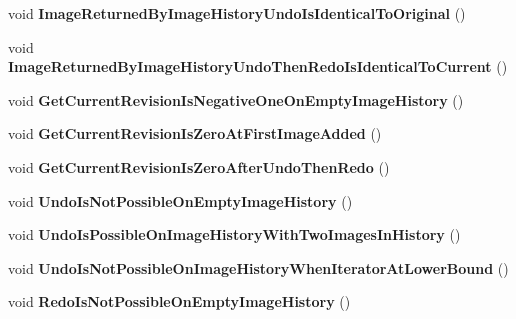 \begin{DoxyCompactItemize}
\item 
\hypertarget{class_tests_1_1_image_history_tester_ab1d89551807ccb29940f83b6c8dcbd40}{
void {\bfseries ImageReturnedByImageHistoryUndoIsIdenticalToOriginal} ()}
\label{class_tests_1_1_image_history_tester_ab1d89551807ccb29940f83b6c8dcbd40}

\item 
\hypertarget{class_tests_1_1_image_history_tester_acaa3c95172e90f5804e31038db2a5bd1}{
void {\bfseries ImageReturnedByImageHistoryUndoThenRedoIsIdenticalToCurrent} ()}
\label{class_tests_1_1_image_history_tester_acaa3c95172e90f5804e31038db2a5bd1}

\item 
\hypertarget{class_tests_1_1_image_history_tester_a35c605d185b3e15d6fc020acb32bf251}{
void {\bfseries GetCurrentRevisionIsNegativeOneOnEmptyImageHistory} ()}
\label{class_tests_1_1_image_history_tester_a35c605d185b3e15d6fc020acb32bf251}

\item 
\hypertarget{class_tests_1_1_image_history_tester_a3b9e48ca23c2f54e07672a71bb9f9e02}{
void {\bfseries GetCurrentRevisionIsZeroAtFirstImageAdded} ()}
\label{class_tests_1_1_image_history_tester_a3b9e48ca23c2f54e07672a71bb9f9e02}

\item 
\hypertarget{class_tests_1_1_image_history_tester_a56a464cd581b73dd07ed5c31db810bae}{
void {\bfseries GetCurrentRevisionIsZeroAfterUndoThenRedo} ()}
\label{class_tests_1_1_image_history_tester_a56a464cd581b73dd07ed5c31db810bae}

\item 
\hypertarget{class_tests_1_1_image_history_tester_a623a6a1617851807780b09d50900fb4c}{
void {\bfseries UndoIsNotPossibleOnEmptyImageHistory} ()}
\label{class_tests_1_1_image_history_tester_a623a6a1617851807780b09d50900fb4c}

\item 
\hypertarget{class_tests_1_1_image_history_tester_a942cf087b58871b937e0f4e4bbbdf0e8}{
void {\bfseries UndoIsPossibleOnImageHistoryWithTwoImagesInHistory} ()}
\label{class_tests_1_1_image_history_tester_a942cf087b58871b937e0f4e4bbbdf0e8}

\item 
\hypertarget{class_tests_1_1_image_history_tester_a849a816b185c0ca81d95c6410c82c970}{
void {\bfseries UndoIsNotPossibleOnImageHistoryWhenIteratorAtLowerBound} ()}
\label{class_tests_1_1_image_history_tester_a849a816b185c0ca81d95c6410c82c970}

\item 
\hypertarget{class_tests_1_1_image_history_tester_a0cdf37b5e3e53ad4772e5516ce38109d}{
void {\bfseries RedoIsNotPossibleOnEmptyImageHistory} ()}
\label{class_tests_1_1_image_history_tester_a0cdf37b5e3e53ad4772e5516ce38109d}


\end{DoxyCompactItemize}

